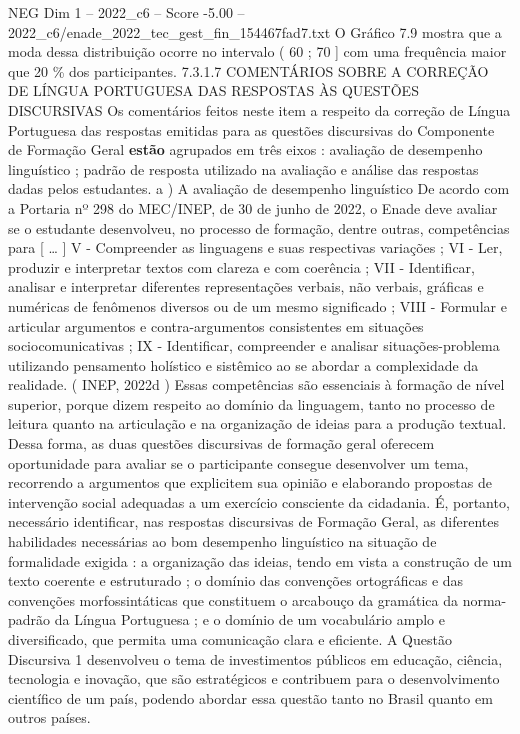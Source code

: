 \begin{textsample}{NEG Dim 1 – 2022\_c6 – Score -5.00 – 2022\_c6/enade\_2022\_tec\_gest\_fin\_154467fad7.txt}
O Gráfico 7.9 mostra que a moda dessa distribuição ocorre no intervalo ( 60 ; 70 ] com uma frequência maior que 20 \% dos participantes. 7.3.1.7 COMENTÁRIOS SOBRE A CORREÇÃO DE LÍNGUA PORTUGUESA DAS RESPOSTAS ÀS QUESTÕES DISCURSIVAS Os comentários feitos neste item a respeito da correção de Língua Portuguesa das respostas emitidas para as questões discursivas do Componente de Formação Geral \textbf{estão} agrupados em três eixos : avaliação de desempenho linguístico ; padrão de resposta utilizado na avaliação e análise das respostas dadas pelos estudantes. a ) A avaliação de desempenho linguístico De acordo com a Portaria nº 298 do MEC/INEP, de 30 de junho de 2022, o Enade deve avaliar se o estudante desenvolveu, no processo de formação, dentre outras, competências para [ … ] V - Compreender as linguagens e suas respectivas variações ; VI - Ler, produzir e interpretar textos com clareza e com coerência ; VII - Identificar, analisar e interpretar diferentes representações verbais, não verbais, gráficas e numéricas de fenômenos diversos ou de um mesmo significado ; VIII - Formular e articular argumentos e contra-argumentos consistentes em situações sociocomunicativas ; IX - Identificar, compreender e analisar situações-problema utilizando pensamento holístico e sistêmico ao se abordar a complexidade da realidade. ( INEP, 2022d ) Essas competências são essenciais à formação de nível superior, porque dizem respeito ao domínio da linguagem, tanto no processo de leitura quanto na articulação e na organização de ideias para a produção textual.
Dessa forma, as duas questões discursivas de formação geral oferecem oportunidade para avaliar se o participante consegue desenvolver um tema, recorrendo a argumentos que explicitem sua opinião e elaborando propostas de intervenção social adequadas a um exercício consciente da cidadania.
É, portanto, necessário identificar, nas respostas discursivas de Formação Geral, as diferentes habilidades necessárias ao bom desempenho linguístico na situação de formalidade exigida : a organização das ideias, tendo em vista a construção de um texto coerente e estruturado ; o domínio das convenções ortográficas e das convenções morfossintáticas que constituem o arcabouço da gramática da norma-padrão da Língua Portuguesa ; e o domínio de um vocabulário amplo e diversificado, que permita uma comunicação clara e eficiente.
A Questão Discursiva 1 desenvolveu o tema de investimentos públicos em educação, ciência, tecnologia e inovação, que são estratégicos e contribuem para o desenvolvimento científico de um país, podendo abordar essa questão tanto no Brasil quanto em outros países.

\end{textsample}
